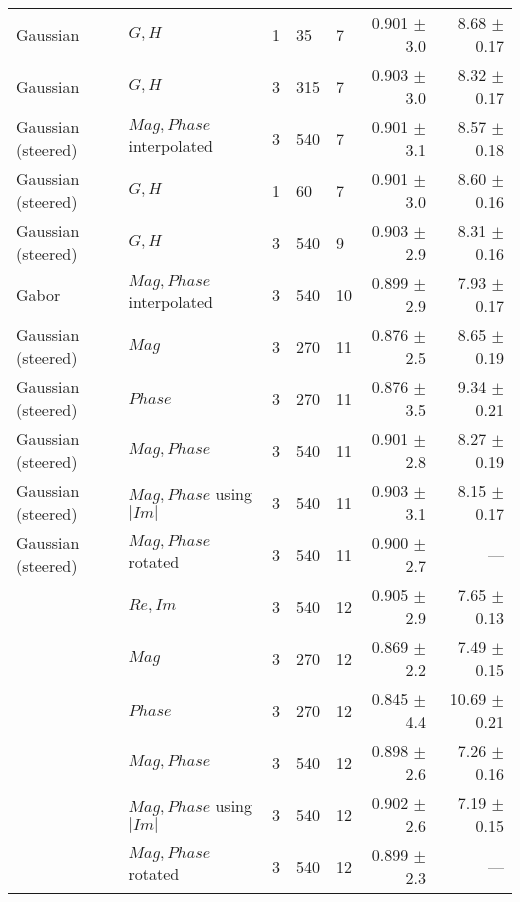 \begin{tabularx}{\linewidth}{p{3cm} X X X X r r}
Gaussian    & $G, H$                & 1 &    35 &   7   & 0.901 $\pm$ 3.0   & 8.68 $\pm$ 0.17   \\
Gaussian    & $G, H$                & 3 &   315 &   7   & 0.903 $\pm$ 3.0   & 8.32 $\pm$ 0.17 \\
Gaussian (steered)& $Mag, Phase$ interpolated
                                    & 3 &   540 &   7   & 0.901 $\pm$ 3.1   & 8.57 $\pm$ 0.18 \\
Gaussian (steered)& $G,H$           & 1 &    60 &   7   & 0.901 $\pm$ 3.0   & 8.60 $\pm$ 0.16 \\
Gaussian (steered)& $G,H$           & 3 &   540 &   9   & 0.903 $\pm$ 2.9   & 8.31 $\pm$ 0.16 \\

Gabor   & $Mag, Phase$ interpolated & 3 &   540 &  10   & 0.899 $\pm$ 2.9   & 7.93 $\pm$ 0.17 \\

Gaussian (steered)& $Mag$           & 3 &   270 &  11   & 0.876 $\pm$ 2.5   & 8.65 $\pm$ 0.19 \\
Gaussian (steered)& $Phase$         & 3 &   270 &  11   & 0.876 $\pm$ 3.5   & 9.34 $\pm$ 0.21 \\
Gaussian (steered)& $Mag, Phase$    & 3 &   540 &  11   & 0.901 $\pm$ 2.8   & 8.27 $\pm$ 0.19 \\
Gaussian (steered)& $Mag, Phase$ using $|Im|$       
                                    & 3 &   540 &  11   & 0.903 $\pm$ 3.1   & 8.15 $\pm$ 0.17 \\
Gaussian (steered)& $Mag, Phase$ rotated            
                                    & 3 &   540 &  11   & 0.900 $\pm$ 2.7   & --- \\
\dtcwt{}& $Re,Im$                   & 3 &   540 &  12   & 0.905 $\pm$ 2.9   & 7.65 $\pm$ 0.13 \\
\dtcwt{}& $Mag$                     & 3 &   270 &  12   & 0.869 $\pm$ 2.2   & 7.49 $\pm$ 0.15 \\
\dtcwt{}& $Phase$                   & 3 &   270 &  12   & 0.845 $\pm$ 4.4   &10.69 $\pm$ 0.21 \\
\dtcwt{}& $Mag,Phase$               & 3 &   540 &  12   & 0.898 $\pm$ 2.6   & 7.26 $\pm$ 0.16 \\
\dtcwt{}& $Mag, Phase$ using $|Im|$ & 3 &   540 &  12   & 0.902 $\pm$ 2.6   & 7.19 $\pm$ 0.15 \\
\dtcwt{}& $Mag, Phase$ rotated      & 3 &   540 &  12   & 0.899 $\pm$ 2.3   & --- \\
        


\end{tabularx}
